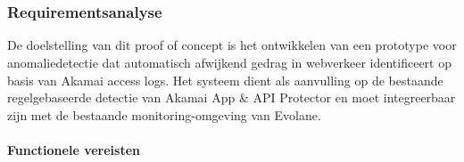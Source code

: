 
\chapter{}%
\label{ch:methodologie}




\subsection{Requirementsanalyse}
\label{subsec:Requirementsanalyse}

De doelstelling van dit proof of concept is het ontwikkelen van een prototype voor anomaliedetectie dat automatisch afwijkend gedrag in webverkeer identificeert op basis van Akamai access logs. Het systeem dient als aanvulling op de bestaande regelgebaseerde detectie van Akamai App \& API Protector en moet integreerbaar zijn met de bestaande monitoring-omgeving van Evolane.

\subsubsection{Functionele vereisten}
 

